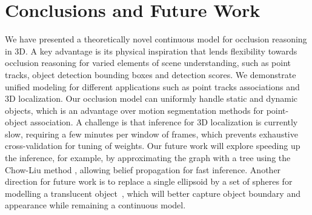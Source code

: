 \section{Conclusions and Future Work}
\label{sec:conclusions}

We have presented a theoretically novel continuous model for occlusion reasoning in 3D. A key advantage is its physical inspiration that lends flexibility towards occlusion reasoning for varied elements of scene understanding, such as point tracks, object detection bounding boxes and detection scores. We demonstrate unified modeling for different applications such as point tracks associations and 3D localization. Our occlusion model can uniformly handle static and dynamic objects, which is an advantage over motion segmentation methods for point-object association. A challenge is that inference for 3D localization is currently slow, requiring a few minutes per window of frames, which prevents exhaustive cross-validation for tuning of weights. Our future work will explore speeding up the inference, for example, by approximating the graph with a tree using the Chow-Liu method \cite{chow1968approximating}, allowing belief propagation for fast inference. Another direction for future work is to replace a single ellipsoid by a set of spheres for modelling a translucent object~\cite{Rhodin2015}, which will better capture object boundary and appearance while remaining a continuous model.




